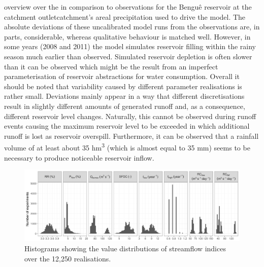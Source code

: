 \DIFdelbegin {}\DIFdelend \DIFaddbegin {}\DIFaddend overview over the \DIFdelbegin {}\DIFdelend \DIFaddbegin {}\DIFaddend in comparison to observations for the Bengu\^e reservoir at the catchment outlet\DIFdelbegin {}\DIFdelend \DIFaddbegin {}\DIFaddend catchment's areal precipitation used to drive the model.
The absolute deviations of these uncalibrated model runs from the observations are, in parts, considerable, whereas qualitative behaviour is matched well.
However, in some years (2008 and 2011) the model simulates reservoir filling within the rainy season much earlier than observed.
Simulated reservoir depletion is often slower than it can be observed which might be the result from an imperfect parameterisation of reservoir abstractions for water consumption.
Overall it should be noted that variability caused by different parameter realisations is rather small.
Deviations mainly appear in a way that different discretisations result in slightly different amounts of generated runoff and, as a consequence, different reservoir level changes.
Naturally, this cannot be observed during runoff events causing the maximum reservoir level to be exceeded in which additional runoff is lost as reservoir overspill.
Furthermore, it can be observed that a rainfall volume of at least about 35 \unit{hm^3} (which is almost equal to 35 \unit{mm}) seems to be necessary to produce noticeable reservoir inflow.

\begin{figure}[t]
\includegraphics[width=\linewidth]{../analysis/sensitivity/hist_hydIndices_overview.png}
\caption{Histograms showing the value distributions of streamflow indices over the 12,250 realisations.}
\label{fig:hydIndices}
\end{figure}

